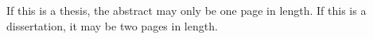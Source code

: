 If this is a thesis, the abstract may only be one page in length.  If this is a dissertation, it may be two pages in length.
